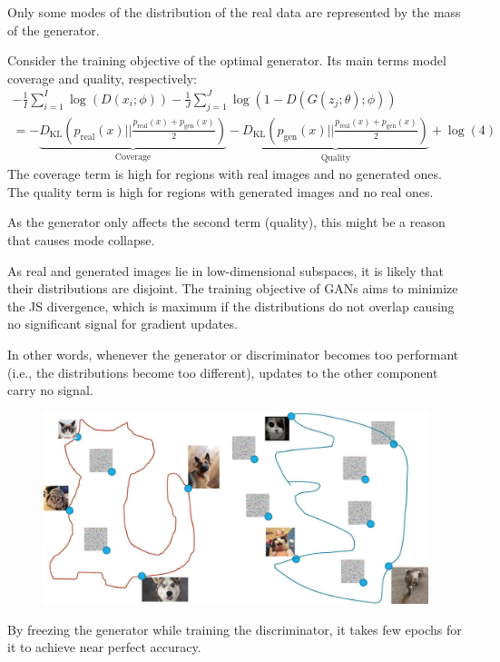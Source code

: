 \begin{remark}
    Only some modes of the distribution of the real data are represented by the mass of the generator.

    Consider the training objective of the optimal generator. Its main terms model coverage and quality, respectively:
    \[ 
        \begin{gathered}
            -\frac{1}{I} \sum_{i=1}^I \log \left( D(x_i; \phi) \right) - \frac{1}{J} \sum_{j=1}^J \log \left( 1- D(G(z_j; \theta); \phi) \right) \\
            = - \underbrace{D_\text{KL}\left( p_\text{real}(x) || \frac{p_\text{real}(x) + p_\text{gen}(x)}{2} \right)}_{\text{Coverage}}
            - \underbrace{D_\text{KL}\left( p_\text{gen}(x) || \frac{p_\text{real}(x) + p_\text{gen}(x)}{2} \right)}_{\text{Quality}}
            + \log(4) 
        \end{gathered}
    \]
    The coverage term is high for regions with real images and no generated ones. The quality term is high for regions with generated images and no real ones.

    As the generator only affects the second term (quality), this might be a reason that causes mode collapse.
\end{remark}

\begin{remark}
    As real and generated images lie in low-dimensional subspaces, it is likely that their distributions are disjoint. The training objective of GANs aims to minimize the JS divergence, which is maximum if the distributions do not overlap causing no significant signal for gradient updates.

    In other words, whenever the generator or discriminator becomes too performant (i.e., the distributions become too different), updates to the other component carry no signal.

    \begin{figure}[H]
        \centering
        \includegraphics[width=0.7\linewidth]{./img/gan_disjoint.jpg}
    \end{figure}

    \indenttbox
    \begin{example}
        By freezing the generator while training the discriminator, it takes few epochs for it to achieve near perfect accuracy.
    \end{example}
\end{remark}


